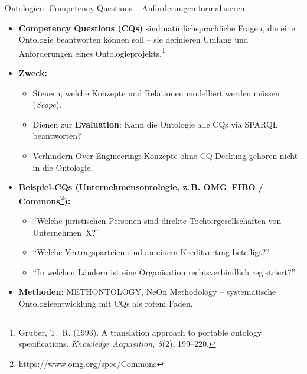 \documentclass[aspectratio=1610, xcolor=dvipsnames, 9pt]{beamer}
\begin{document}
\begin{frame}{Ontologien: Competency Questions -- Anforderungen formalisieren}
  \begin{itemize}
    \item \textbf{Competency Questions (CQs)} sind natürlichsprachliche Fragen, die eine Ontologie beantworten können soll -- sie definieren Umfang und Anforderungen eines Ontologieprojekts.\footnote{Gruber, T.~R. (1993). A translation approach to portable ontology specifications. \textit{Knowledge Acquisition, 5}(2), 199--220.}
    \item \textbf{Zweck:}
      \begin{itemize}
        \item Steuern, welche Konzepte und Relationen modelliert werden müssen (\emph{Scope}).
        \item Dienen zur \textbf{Evaluation}: Kann die Ontologie alle CQs via SPARQL beantworten?
        \item Verhindern Over-Engineering: Konzepte ohne CQ-Deckung gehören nicht in die Ontologie.
      \end{itemize}
    \item \textbf{Beispiel-CQs (Unternehmensontologie, z.\,B. OMG~FIBO / Commons\footnote{\url{https://www.omg.org/spec/Commons}}):}
      \begin{itemize}
        \item ``Welche juristischen Personen sind direkte Tochtergesellschaften von Unternehmen~X?''
        \item ``Welche Vertragsparteien sind an einem Kreditvertrag beteiligt?''
        \item ``In welchen Ländern ist eine Organisation rechtsverbindlich registriert?''
      \end{itemize}
    \item \textbf{Methoden:} METHONTOLOGY, NeOn Methodology -- systematische Ontologieentwicklung mit CQs als rotem Faden.
  \end{itemize}
\end{frame}
\end{document}
